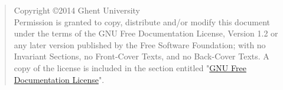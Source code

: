 
\begin{quote}
    Copyright \copyright  2014 Ghent University\\
    Permission is granted to copy, distribute and/or modify this document
    under the terms of the GNU Free Documentation License, Version 1.2
    or any later version published by the Free Software Foundation;
    with no Invariant Sections, no Front-Cover Texts, and no Back-Cover Texts.
    A copy of the license is included in the section entitled
    "\hyperlink{ReferenceManual:GNUFreeDocumentationLicense}{GNU Free Documentation
    License}".
\end{quote}
